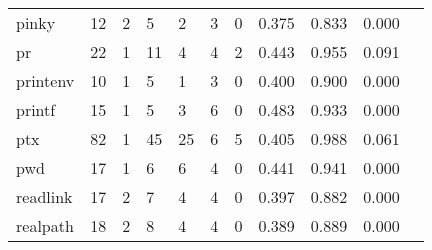 \begin{longtable}{lp{1.10cm}p{1.10cm}p{1.10cm}p{1.10cm}p{1.10cm}p{1.10cm}p{1.10cm}p{1.10cm}p{1.10cm}p{1.10cm}}
pinky     &                     12 &                                  2 &                                 5 &                                2 &                                 3 &                               0 &                          0.375 &                                 0.833 &                               0.000 \\
pr        &                     22 &                                  1 &                                11 &                                4 &                                 4 &                               2 &                          0.443 &                                 0.955 &                               0.091 \\
printenv  &                     10 &                                  1 &                                 5 &                                1 &                                 3 &                               0 &                          0.400 &                                 0.900 &                               0.000 \\
printf    &                     15 &                                  1 &                                 5 &                                3 &                                 6 &                               0 &                          0.483 &                                 0.933 &                               0.000 \\
ptx       &                     82 &                                  1 &                                45 &                               25 &                                 6 &                               5 &                          0.405 &                                 0.988 &                               0.061 \\
pwd       &                     17 &                                  1 &                                 6 &                                6 &                                 4 &                               0 &                          0.441 &                                 0.941 &                               0.000 \\
readlink  &                     17 &                                  2 &                                 7 &                                4 &                                 4 &                               0 &                          0.397 &                                 0.882 &                               0.000 \\
realpath  &                     18 &                                  2 &                                 8 &                                4 &                                 4 &                               0 &                          0.389 &                                 0.889 &                               0.000 \\

\end{longtable}
